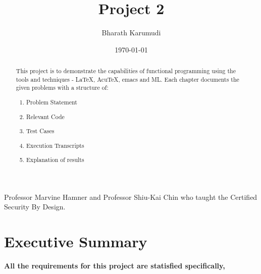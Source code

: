 \documentclass{report}
\title{Project 2}
\author{Bharath Karumudi}
\date{\today}
\begin{document}
 \lstset{language=ML}
 \maketitle{}

 \begin{abstract}
   This project is to demonstrate the capabilities of functional
   programming using the tools and techniques - \LaTeX{}, AcuTeX,
   emacs and ML. Each chapter documents the given problems with a
   structure of:
   \begin{enumerate}
   \item Problem Statement
   \item Relevant Code
   \item Test Cases
   \item Execution Transcripts
   \item Explanation of results
   \end{enumerate}

 \end{abstract}


 \begin{acknowledgments}
  Professor Marvine Hamner and Professor Shiu-Kai Chin who taught the
  Certified Security By Design.
 \end{acknowledgments}

 \tableofcontents{}

 \chapter{Executive Summary}
 \label{cha:executive-summary}

\textbf{All the requirements for this project are statisfied specifically,}
\end{document}
